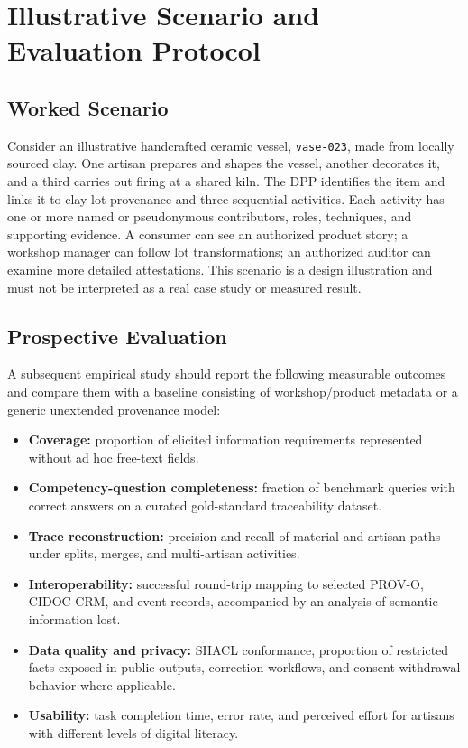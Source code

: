 \documentclass[conference]{IEEEtran}
\begin{document}
\section{Illustrative Scenario and Evaluation Protocol}
\subsection{Worked Scenario}
Consider an illustrative handcrafted ceramic vessel, \texttt{vase-023}, made from locally sourced clay. One artisan prepares and shapes the vessel, another decorates it, and a third carries out firing at a shared kiln. The DPP identifies the item and links it to clay-lot provenance and three sequential activities. Each activity has one or more named or pseudonymous contributors, roles, techniques, and supporting evidence. A consumer can see an authorized product story; a workshop manager can follow lot transformations; an authorized auditor can examine more detailed attestations. This scenario is a design illustration and must not be interpreted as a real case study or measured result.

\subsection{Prospective Evaluation}
A subsequent empirical study should report the following measurable outcomes and compare them with a baseline consisting of workshop/product metadata or a generic unextended provenance model:
\begin{itemize}
\item \textbf{Coverage:} proportion of elicited information requirements represented without ad hoc free-text fields.
\item \textbf{Competency-question completeness:} fraction of benchmark queries with correct answers on a curated gold-standard traceability dataset.
\item \textbf{Trace reconstruction:} precision and recall of material and artisan paths under splits, merges, and multi-artisan activities.
\item \textbf{Interoperability:} successful round-trip mapping to selected PROV-O, CIDOC CRM, and event records, accompanied by an analysis of semantic information lost.
\item \textbf{Data quality and privacy:} SHACL conformance, proportion of restricted facts exposed in public outputs, correction workflows, and consent withdrawal behavior where applicable.
\item \textbf{Usability:} task completion time, error rate, and perceived effort for artisans with different levels of digital literacy.
\end{itemize}
\end{document}
